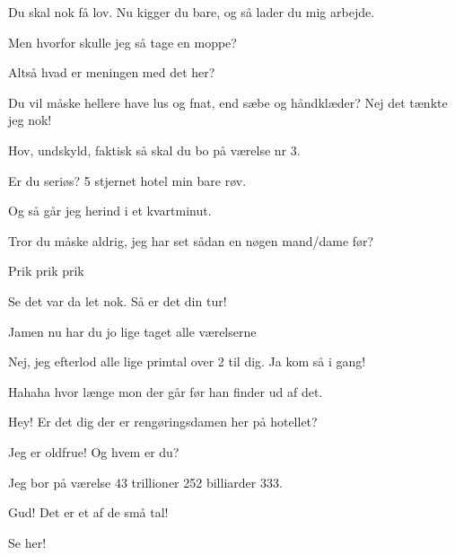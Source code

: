 \documentclass[a4paper,11pt]{article}
\begin{document}
\begin{sketch}
 Du skal nok få lov. Nu kigger du bare, og så lader du mig arbejde.

 Men hvorfor skulle jeg så tage en moppe?


 Altså hvad er meningen med det her?

 Du vil måske hellere have lus og fnat, end sæbe og håndklæder? Nej det tænkte jeg nok!


 Hov, undskyld, faktisk så skal du bo på værelse nr 3.

 Er du seriøs? 5 stjernet hotel min bare røv.


 Og så går jeg herind i et kvartminut.

 

 Tror du måske aldrig, jeg har set sådan en nøgen mand/dame før?


 Prik prik prik


 Se det var da let nok. Så er det din tur!

 Jamen nu har du jo lige taget alle værelserne

 Nej, jeg efterlod alle lige primtal over 2 til dig. Ja kom så i gang!


 Hahaha hvor længe mon der går før han finder ud af det.


 Hey! Er det dig der er rengøringsdamen her på hotellet?

 Jeg er oldfrue! Og hvem er du?

 Jeg bor på værelse 43 trillioner 252 billiarder 333.

 Gud! Det er et af de små tal!

 Se her!



\end{sketch}
\end{document}

